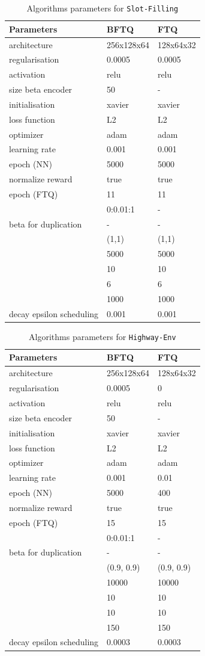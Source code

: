 \begin{table}[tp]
    \centering
    \begin{tabularx}{1.0\textwidth}{lll}
        \toprule
        Parameters & BFTQ & FTQ\tabularnewline
        \midrule
        architecture & 256x128x64 & 128x64x32\tabularnewline
        regularisation & 0.0005 & 0.0005\tabularnewline
        activation & relu & relu\tabularnewline
        size beta encoder & 50 & -\tabularnewline
        initialisation & xavier & xavier\tabularnewline
        loss function & L2 & L2\tabularnewline
        optimizer & adam & adam\tabularnewline
        learning rate & 0.001 & 0.001\tabularnewline
        epoch (NN) & 5000 & 5000\tabularnewline
        normalize reward & true & true\tabularnewline
        epoch (FTQ) & 11 & 11\tabularnewline
        & 0:0.01:1 & -\tabularnewline
        beta for duplication & - & -\tabularnewline
        & (1,1) & (1,1)\tabularnewline
        & 5000 & 5000\tabularnewline
        & 10 & 10\tabularnewline
        & 6 & 6\tabularnewline
        & 1000 & 1000\tabularnewline
        decay epsilon scheduling & 0.001 & 0.001\tabularnewline
        \bottomrule
    \end{tabularx}
    \caption{Algorithms parameters for \texttt{Slot-Filling}}
    \label{tab:param-algo-slot-filling}
\end{table}
%
\begin{table}[tp]
    \centering
    \begin{tabularx}{1.0\textwidth}{lll}
        \toprule
        Parameters & BFTQ & FTQ\tabularnewline
        \midrule
        architecture & 256x128x64 & 128x64x32\tabularnewline
        regularisation & 0.0005 & 0\tabularnewline
        activation & relu & relu\tabularnewline
        size beta encoder & 50 & -\tabularnewline
        initialisation & xavier & xavier\tabularnewline
        loss function & L2 & L2\tabularnewline
        optimizer & adam & adam\tabularnewline
        learning rate & 0.001 & 0.01\tabularnewline
        epoch (NN) & 5000 & 400\tabularnewline
        normalize reward & true & true\tabularnewline
        epoch (FTQ) & 15 & 15\tabularnewline
        & 0:0.01:1 & -\tabularnewline
        beta for duplication & - & -\tabularnewline
        & (0.9, 0.9) & (0.9, 0.9)\tabularnewline
        & 10000 & 10000\tabularnewline
        & 10 & 10\tabularnewline
        & 10 & 10\tabularnewline
        & 150 & 150\tabularnewline
        decay epsilon scheduling & 0.0003 & 0.0003\tabularnewline
        \bottomrule
    \end{tabularx}
    \caption{Algorithms parameters for \texttt{Highway-Env}}
    \label{tab:param-algo-highway-env}
\end{table}

